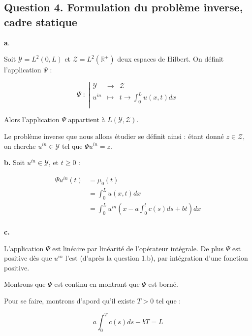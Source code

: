 \documentclass[a4paper]{article}
\newcommand{\Y}{\mathscr{Y}}
\newcommand{\Z}{\mathscr{Z}}
\begin{document}
\subsection*{Question 4. Formulation du problème inverse, cadre statique}


\textbf{a}.

Soit $\Y = L^2(0,L)$ et $\Z = L^2(\mathbb{R}^+)$ deux espaces de Hilbert. 
On définit l'application $\Psi$ :

 \begin{equation}
	 \Psi \; : \; \left\vert
	\begin{array}{ccc}
	\Y & \to & \Z \\
	u^{in} & \mapsto & t \to \int_0^L u(x,t) dx\\
	\end{array} \right.
\end{equation}

Alors l'application $\Psi$ appartient à $L(\Y,\Z)$.

\begin{definition}
Le problème inverse que nous allons étudier se définit ainsi : 
étant donné $z \in \Z$, on cherche $u^{in} \in \Y$ 
tel que $\Psi u^{in} = z$.
\end{definition}

\textbf{b.}
Soit $u^{in} \in \Y$, et $t \geq 0$ :

\[ \begin{split}
\Psi u^{in}(t) &= \mu_0 (t) \\
               &= \int_0^L u(x,t) dx \\
			   &= \int_0^L u^{in}( x - a\int_0^tc(s)ds + bt) dx \\
\end{split}\]

\textbf{c.}

L'application $\Psi$ est linéaire par linéarité de l'opérateur intégrale.
De plus $\Psi $ est positive dès que $u^{in}$ l'est (d'après la question 1.b), par intégration d'une fonction positive.

Montrons que $\Psi$ est continu en montrant que $\Psi$ est borné.

Pour se faire, montrons d'apord qu'il existe $T>0$ tel que :

\[ a\int_0^Tc(s)ds - bT = L\]
\end{document}
